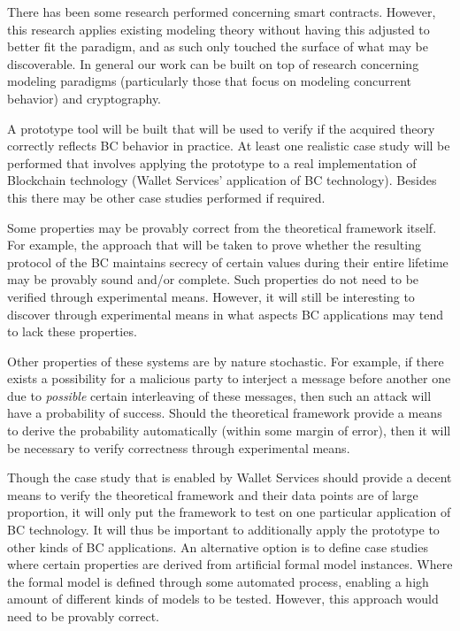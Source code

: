 \documentclass[]{article}
\begin{document}
There has been some research performed concerning smart contracts. However, this research applies existing modeling theory without having this adjusted to better fit the paradigm, and as such only touched the surface of what may be discoverable. In general our work can be built on top of research concerning modeling paradigms (particularly those that focus on modeling concurrent behavior) and cryptography.

A prototype tool will be built that will be used to verify if the acquired theory correctly reflects BC behavior in practice. At least one realistic case study will be performed that involves applying the prototype to a real implementation of Blockchain technology (Wallet Services' application of BC technology). Besides this there may be other case studies performed if required.

Some properties may be provably correct from the theoretical framework itself. For example, the approach that will be taken to prove whether the resulting protocol of the BC maintains secrecy of certain values during their entire lifetime may be provably sound and/or complete. Such properties do not need to be verified through experimental means. However, it will still be interesting to discover through experimental means in what aspects BC applications may tend to lack these properties.

Other properties of these systems are by nature stochastic. For example, if there exists a possibility for a malicious party to interject a message before another one due to \emph{possible} certain interleaving of these messages, then such an attack will have a probability of success. Should the theoretical framework provide a means to derive the probability automatically (within some margin of error), then it will be necessary to verify correctness through experimental means.

Though the case study that is enabled by Wallet Services should provide a decent means to verify the theoretical framework and their data points are of large proportion, it will only put the framework to test on one particular application of BC technology. It will thus be important to additionally apply the prototype to other kinds of BC applications. An alternative option is to define case studies where certain properties are derived from artificial formal model instances. Where the formal model is defined through some automated process, enabling a high amount of different kinds of models to be tested. However, this approach would need to be provably correct.
\end{document}
